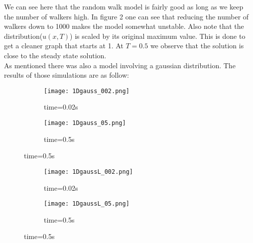 \documentclass[a4paper,11pt]{article}
\newcommand{\vsp}{\vspace{0.2cm}} %
\begin{document}
    We can see here that the random walk model is fairly good as long as we keep the number of walkers high. In figure 2 one can see that reducing the number of walkers down to 1000 makes the model somewhat unstable. Also note that the distribution($u(x,T)$) is scaled by its original maximum value. This is done to get a cleaner graph that starts at 1. At $T=0.5$ we observe that the solution is close to the steady state solution.\vsp \\
    As mentioned there was also a model involving a gaussian distribution. The results of those simulations are as follow:
    \begin{figure}[H]
        \caption{Gaussian random walk model $10^6$ walkers $\Delta t = 0.00005$}
        \captionsetup[subfigure]{labelformat=empty}
        \begin{subfigure}[b!]{0.55\textwidth}
            \texttt{[image: 1Dgauss\_002.png]}
            \caption{time=0.02s}
        \end{subfigure}
        \begin{subfigure}[b!]{0.55\textwidth}
            \texttt{[image: 1Dgauss\_05.png]}
            \caption{time=0.5s}
        \end{subfigure}
    \end{figure}
    \begin{figure}[H]
        \caption{Gaussian random walk model $10^3$ walkers $\Delta t = 0.00005$}
        \captionsetup[subfigure]{labelformat=empty}
        \begin{subfigure}[b!]{0.55\textwidth}
            \texttt{[image: 1DgaussL\_002.png]}
            \caption{time=0.02s}
        \end{subfigure}
        \begin{subfigure}[b!]{0.55\textwidth}
            \texttt{[image: 1DgaussL\_05.png]}
            \caption{time=0.5s}
        \end{subfigure}
    \end{figure} \justify
    
\end{document}
